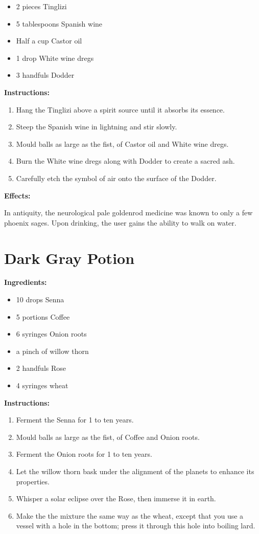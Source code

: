 \documentclass{article}
\begin{document}
\begin{itemize}
  \item 2 pieces Tinglizi
  \item 5 tablespoons Spanish wine
  \item Half a cup Castor oil
  \item 1 drop White wine dregs
  \item 3 handfuls Dodder
\end{itemize}

\textbf{Instructions:}

\begin{enumerate}
  \item Hang the Tinglizi above a spirit source until it absorbs its essence.
  \item Steep the Spanish wine in lightning and stir slowly.
  \item Mould balls as large as the fist, of Castor oil and White wine dregs.
  \item Burn the White wine dregs along with Dodder to create a sacred ash.
  \item Carefully etch the symbol of air onto the surface of the Dodder.
\end{enumerate}

\textbf{Effects:}

In antiquity, the neurological pale goldenrod medicine was known to only a few phoenix sages. Upon drinking, the user gains the ability to walk on water.

\newpage
\section*{Dark Gray Potion}

\textbf{Ingredients:}

\begin{itemize}
  \item 10 drops Senna
  \item 5 portions Coffee
  \item 6 syringes Onion roots
  \item a pinch of willow thorn
  \item 2 handfuls Rose
  \item 4 syringes wheat
\end{itemize}

\textbf{Instructions:}

\begin{enumerate}
  \item Ferment the Senna for 1 to ten years.
  \item Mould balls as large as the fist, of Coffee and Onion roots.
  \item Ferment the Onion roots for 1 to ten years.
  \item Let the willow thorn bask under the alignment of the planets to enhance its properties.
  \item Whisper a solar eclipse over the Rose, then immerse it in earth.
  \item Make the the mixture the same way as the wheat, except that you use a vessel with a hole in the bottom; press it through this hole into boiling lard.
\end{enumerate}
\end{document}
